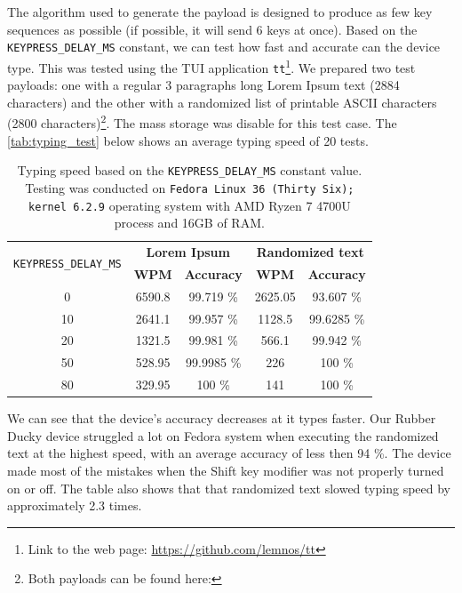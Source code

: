 The algorithm used to generate the payload is designed to produce as few key sequences as possible (if possible, it will send 6 keys at once). Based on the \verb|KEYPRESS_DELAY_MS| constant, we can test how fast and accurate can the device type. This was tested using the TUI application \verb|tt|\footnote{Link to the web page: \url{https://github.com/lemnos/tt}}. We prepared two test payloads: one with a regular 3 paragraphs long Lorem Ipsum text (2884 characters) and the other with a randomized list of printable ASCII characters (2800 characters)\footnote{Both payloads can be found here: }. The mass storage was disable for this test case. The \autoref{tab:typing_test} below shows an average typing speed of 20 tests.
\begin{table}[ht]
    \centering
    \begin{tabular}{|c|c|c|c|c|} \hline
        \multirow{2}{*}{\texttt{KEYPRESS\_DELAY\_MS}} & \multicolumn{2}{|c|}{\textbf{Lorem Ipsum}} & \multicolumn{2}{|c|}{\textbf{Randomized text}} \\ \cline{2-5}
                                                      & \textbf{WPM} &           \textbf{Accuracy} & \textbf{WPM} &               \textbf{Accuracy} \\ \hline
                                                    0 &       6590.8 &                   99.719 \% &      2625.05 &                      93.607 \%  \\ \hline
                                                   10 &       2641.1 &                   99.957 \% &       1128.5 &                     99.6285 \%  \\ \hline
                                                   20 &       1321.5 &                   99.981 \% &        566.1 &                      99.942 \%  \\ \hline
                                                   50 &       528.95 &                  99.9985 \% &          226 &                         100 \%  \\ \hline
                                                   80 &       329.95 &                      100 \% &          141 &                         100 \%  \\ \hline
    \end{tabular}
    \caption{Typing speed based on the \texttt{KEYPRESS\_DELAY\_MS} constant value. Testing was conducted on \texttt{Fedora Linux 36 (Thirty Six); kernel 6.2.9} operating system with AMD Ryzen 7 4700U process and 16GB of RAM.}
    \label{tab:typing_test}
\end{table}
We can see that the device's accuracy decreases at it types faster. Our Rubber Ducky device struggled a lot on Fedora system when executing the randomized text at the highest speed, with an average accuracy of less then 94 \%. The device made most of the mistakes when the Shift key modifier was not properly turned on or off. The table also shows that that randomized text slowed typing speed by approximately 2.3 times.


